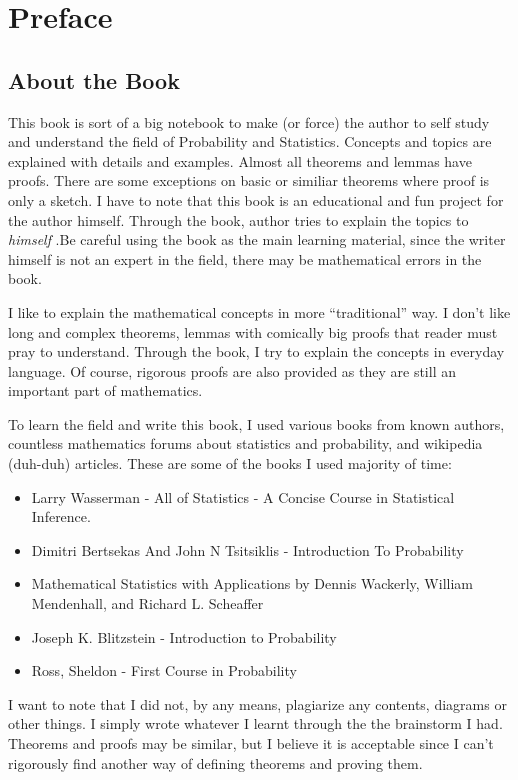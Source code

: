 \chapter*{Preface}

\section*{About the Book}
This book is sort of a big notebook to make (or force) the author to self study and understand the field of Probability and Statistics.
Concepts and topics are explained with details and examples. Almost all theorems and lemmas have proofs. There are some exceptions on basic or similiar theorems where proof is only a sketch.
I have to note that this book is an educational and fun project for the author himself. Through the book, author tries to explain the topics to \textit{himself} .Be careful using the book as the main learning material, since the writer himself is not an expert in the field, there may be mathematical errors in the book.
\par

I like to explain the mathematical concepts in more ``traditional'' way. I don't like long and complex theorems, lemmas with comically big proofs that reader must pray to understand. Through the book, I try to explain the concepts in everyday language. Of course, rigorous proofs are also provided as they are still an important part of mathematics.
\par
To learn the field and write this book, I used various books from known authors, countless mathematics forums about statistics and probability, and wikipedia (duh-duh) articles. These are some of the books I used majority of time:

\begin{itemize}
    \item Larry Wasserman - All of Statistics - A Concise Course in Statistical Inference.
    \item Dimitri Bertsekas And John N Tsitsiklis - Introduction To Probability
    \item Mathematical Statistics with Applications by Dennis Wackerly, William Mendenhall, and Richard L. Scheaffer
    \item Joseph K. Blitzstein - Introduction to Probability
    \item Ross, Sheldon - First Course in Probability
  \end{itemize}
I want to note that I did not, by any means, plagiarize any contents, diagrams or other things. I simply wrote whatever I learnt through the the brainstorm I had. Theorems and proofs may be similar, but I believe it is acceptable since I can't rigorously find another way of defining theorems and proving them.
  

